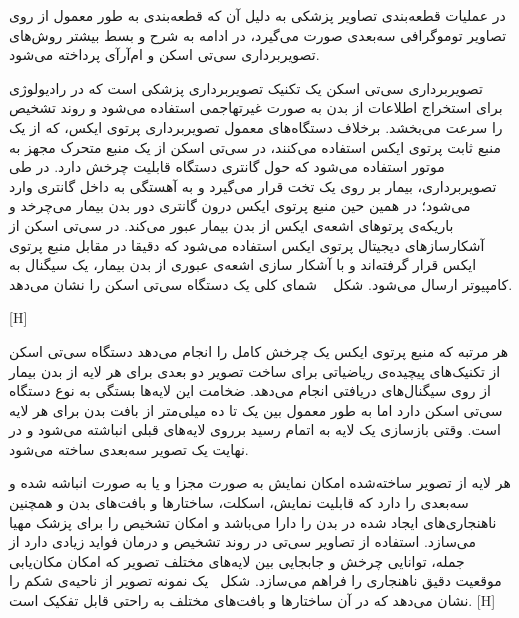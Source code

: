 در عملیات قطعه‌بندی تصاویر پزشکی به دلیل آن که قطعه‌بندی به طور معمول از روی تصاویر توموگرافی سه‌بعدی صورت می‌گیرد، در ادامه به شرح و بسط بیشتر روش‌های تصویربرداری سی‌تی اسکن و ام‌آرآی پرداخته می‌شود. 
 

تصویربرداری سی‌تی اسکن یک تکنیک تصویربرداری پزشکی است که در رادیولوژی برای استخراج اطلاعات از بدن به صورت غیرتهاجمی استفاده می‌شود و روند تشخیص را سرعت می‌بخشد. برخلاف دستگاه‌های معمول تصویربرداری پرتوی ایکس، که از یک منبع ثابت پرتوی ایکس استفاده می‌کنند، در سی‌تی اسکن از یک منبع متحرک مجهز به موتور استفاده می‌شود که حول گانتری دستگاه قابلیت چرخش دارد. در طی تصویربرداری، بیمار بر روی یک تخت قرار می‌گیرد و به آهستگی به داخل گانتری وارد می‌شود؛ در همین حین منبع پرتوی ایکس درون گانتری دور بدن بیمار می‌چرخد و باریکه‌ی پرتوهای اشعه‌ی ایکس از بدن بیمار عبور می‌کند. در سی‌تی اسکن  از آشکارسازهای دیجیتال پرتوی ایکس استفاده می‌شود که دقیقا در مقابل منبع پرتوی‌ ایکس قرار گرفته‌اند و با آشکار سازی اشعه‌ی عبوری از بدن بیمار، یک سیگنال به کامپیوتر ارسال می‌شود. شکل ~ شمای کلی یک دستگاه سی‌تی اسکن را نشان می‌دهد.

[H]

هر مرتبه که منبع پرتوی ایکس یک چرخش کامل را انجام می‌دهد دستگاه سی‌تی اسکن از تکنیک‌های پیچیده‌ی ریاضیاتی برای ساخت تصویر دو بعدی برای هر لایه از بدن بیمار از روی سیگنال‌های دریافتی انجام می‌دهد. ضخامت این لایه‌ها بستگی به نوع دستگاه سی‌تی اسکن دارد اما به طور معمول بین یک تا ده میلی‌متر از بافت بدن برای هر لایه است. وقتی بازسازی یک لایه به اتمام رسید برروی لایه‌های قبلی انباشته می‌شود و در نهایت یک تصویر سه‌بعدی ساخته می‌شود.

هر لایه از تصویر ساخته‌شده امکان نمایش به صورت مجزا و یا به صورت انباشه شده و سه‌بعدی را دارد که قابلیت نمایش، اسکلت، ساختارها و بافت‌های بدن و همچنین ناهنجاری‌های ایجاد شده در بدن را دارا می‌باشد و امکان تشخیص را برای پزشک مهیا می‌سازد. استفاده از تصاویر سی‌تی در روند تشخیص و درمان فواید زیادی دارد از جمله، توانایی چرخش و جابجایی بین لایه‌های مختلف تصویر که امکان مکان‌یابی موقعیت دقیق ناهنجاری را فراهم می‌سازد. شکل~ یک نمونه تصویر از ناحیه‌ی شکم را نشان می‌دهد که در آن ساختارها و بافت‌های مختلف به راحتی قابل تفکیک است.
[H]

